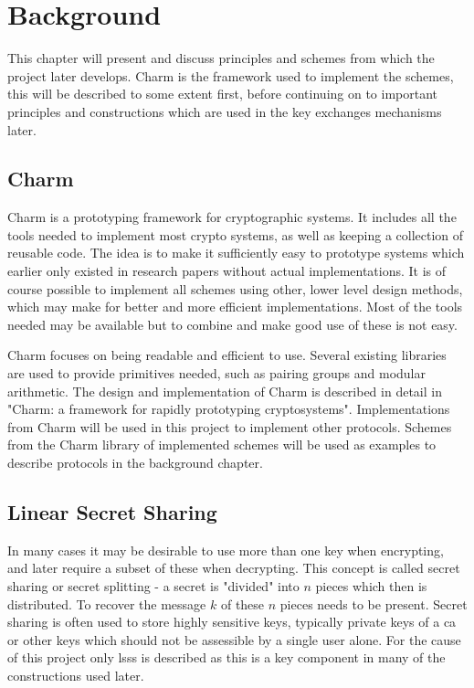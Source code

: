 \chapter{Background}
\label{chp:background} 
This chapter will present and discuss principles and schemes from which the project later develops. Charm is the framework used to implement the schemes, this will be described to some extent first, before continuing on to important principles and constructions which are used in the key exchanges mechanisms later.

\section{Charm}
Charm \cite{DBLP:Charm13} is a prototyping framework for cryptographic systems. It includes all the tools needed to implement most crypto systems, as well as keeping a collection of reusable code. The idea is to make it sufficiently easy to prototype systems which earlier only existed in research papers without actual implementations. It is of course possible to implement all schemes using other, lower level design methods, which may make for better and more efficient implementations. Most of the tools needed may be available but to combine and make good use of these is not easy. 
\par Charm focuses on being readable and efficient to use. Several existing libraries are used to provide primitives needed, such as pairing groups and modular arithmetic. The design and implementation of Charm is described in detail in "Charm: a framework for rapidly prototyping cryptosystems"\cite{DBLP:Charm13}. Implementations from Charm will be used in this project to implement other protocols. Schemes from the Charm library of implemented schemes will be used as examples to describe protocols in the background chapter.


\section{Linear Secret Sharing}\label{subsec:lsss}
In many cases it may be desirable to use more than one key when encrypting, and later require a subset of these when decrypting. This concept is called secret sharing or secret splitting - a secret is "divided" into $n$ pieces which then is distributed. To recover the message $k$ of these $n$ pieces needs to be present. Secret sharing is often used to store highly sensitive keys, typically private keys of a \gls{ca} or other keys which should not be assessible by a single user alone. For the cause of this project only \gls{lsss} is described as this is a key component in many of the constructions used later. 

